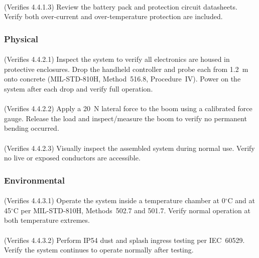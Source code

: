 \paragraph{}
(Verifies 4.4.1.3) Review the battery pack and protection circuit datasheets.  Verify both over-current and over-temperature protection are included.

\subsubsection{Physical}

\paragraph{}
(Verifies 4.4.2.1) Inspect the system to verify all electronics are housed in protective enclosures.  Drop the handheld controller and probe each from 1.2~m onto concrete (MIL-STD-810H, Method~516.8, Procedure~IV).  Power on the system after each drop and verify full operation.

\paragraph{}
(Verifies 4.4.2.2) Apply a 20~N lateral force to the boom using a calibrated force gauge.  Release the load and inspect/measure the boom to verify no permanent bending occurred.

\paragraph{}
(Verifies 4.4.2.3) Visually inspect the assembled system during normal use.  Verify no live or exposed conductors are accessible.

\subsubsection{Environmental}

\paragraph{}
(Verifies 4.4.3.1) Operate the system inside a temperature chamber at 0$^{\circ}$C and at 45$^{\circ}$C per MIL-STD-810H, Methods~502.7 and 501.7.  Verify normal operation at both temperature extremes.

\paragraph{}
(Verifies 4.4.3.2) Perform IP54 dust and splash ingress testing per IEC~60529.  Verify the system continues to operate normally after testing.

